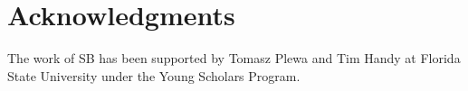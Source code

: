 \documentclass[iop]{emulateapj}
\begin{document}
%
%
%
\section{Acknowledgments}\label{s:ack}
%
The work of SB has been supported by Tomasz Plewa and Tim Handy at Florida State University under the Young Scholars Program.
%
%
%


%
%
%
\end{document}
